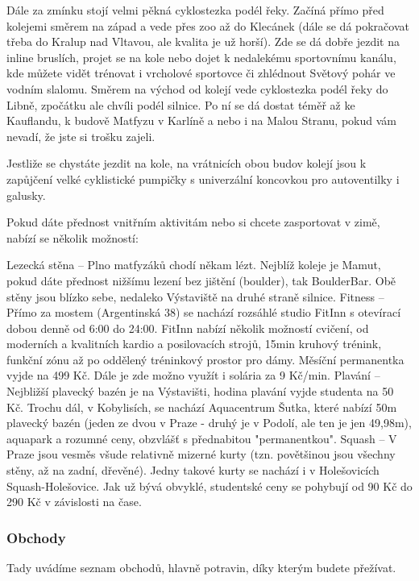 Dále za zmínku stojí velmi pěkná cyklostezka podél řeky. Začíná přímo před kolejemi směrem na západ a vede přes zoo až do Klecánek (dále se dá pokračovat třeba do Kralup nad Vltavou, ale kvalita je už horší). Zde se dá dobře jezdit na inline bruslích, projet se na kole nebo dojet k nedalekému sportovnímu kanálu, kde můžete vidět trénovat i vrcholové sportovce či zhlédnout Světový pohár ve vodním slalomu. Směrem na východ od kolejí vede cyklostezka podél řeky do Libně, zpočátku ale chvíli podél silnice. Po ní se dá dostat téměř až ke Kauflandu, k budově Matfyzu v Karlíně a nebo i na Malou Stranu, pokud vám nevadí, že jste si trošku zajeli.

Jestliže se chystáte jezdit na kole, na vrátnicích obou budov kolejí jsou k zapůjčení velké cyklistické pumpičky s univerzální koncovkou pro autoventilky i galusky.

Pokud dáte přednost vnitřním aktivitám nebo si chcete zasportovat v zimě, nabízí se několik možností:

Lezecká stěna – Plno matfyzáků chodí někam lézt. Nejblíž koleje je Mamut, pokud dáte přednost nižšímu lezení bez jištění (boulder), tak BoulderBar. Obě stěny jsou blízko sebe, nedaleko Výstaviště na druhé straně silnice.
Fitness – Přímo za mostem (Argentinská 38) se nachází rozsáhlé studio FitInn s otevírací dobou denně od 6:00 do 24:00. FitInn nabízí několik možností cvičení, od moderních a kvalitních kardio a posilovacích strojů, 15min kruhový trénink, funkční zónu až po oddělený tréninkový prostor pro dámy. Měsíční permanentka vyjde na 499 Kč. Dále je zde možno využít i solária za 9 Kč/min.
Plavání – Nejbližší plavecký bazén je na Výstavišti, hodina plavání vyjde studenta na 50 Kč. Trochu dál, v Kobylisích, se nachází Aquacentrum Šutka, které nabízí 50m plavecký bazén (jeden ze dvou v Praze - druhý je v Podolí, ale ten je jen 49,98m), aquapark a rozumné ceny, obzvlášť s přednabitou "permanentkou".
Squash – V Praze jsou vesměs všude relativně mizerné kurty (tzn. povětšinou jsou všechny stěny, až na zadní, dřevěné). Jedny takové kurty se nachází i v Holešovicích Squash-Holešovice. Jak už bývá obvyklé, studentské ceny se pohybují od 90 Kč do 290 Kč v závislosti na čase.


\subsubsection{Obchody}
Tady uvádíme seznam obchodů, hlavně potravin, díky kterým budete přežívat.

